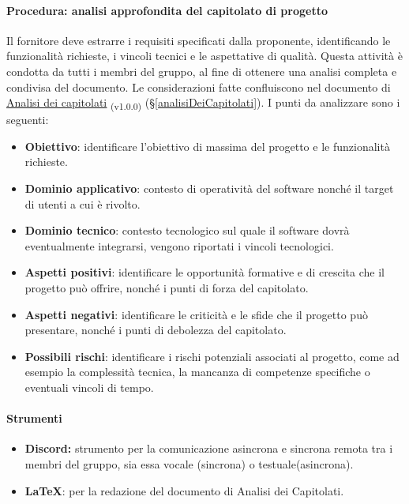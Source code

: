 \documentclass[a4paper,12pt]{article}
\newcommand{\ped}[1]{\textsubscript{#1}}
\begin{document}
\paragraph{Procedura: analisi approfondita del capitolato di progetto}
Il fornitore deve estrarre i requisiti specificati dalla proponente,
identificando le funzionalità richieste, i vincoli tecnici e le aspettative di
qualità. Questa attività è condotta da tutti i membri del gruppo, al fine di
ottenere una analisi completa e condivisa del documento. Le considerazioni
fatte confluiscono nel documento di
\href{https://7-zpus.github.io/Docs/assets/1_Candidatura/AnalisiCapitolati.pdf}{\ul{Analisi
        dei capitolati}} \ped{(v1.0.0)}
(§\ref{analisiDeiCapitolati}). I punti da analizzare sono i seguenti:
\begin{itemize}
    \item \textbf{Obiettivo}: identificare l'obiettivo di massima del progetto e le funzionalità richieste.
    \item \textbf{Dominio applicativo}: contesto di operatività del software nonché il target di utenti a cui è rivolto.
    \item \textbf{Dominio tecnico}: contesto tecnologico sul quale il software dovrà eventualmente integrarsi, vengono riportati i vincoli tecnologici.
    \item \textbf{Aspetti positivi}: identificare le opportunità formative e di crescita che il progetto può offrire, nonché i punti di forza del capitolato.
    \item \textbf{Aspetti negativi}: identificare le criticità e le sfide che il progetto può presentare, nonché i punti di debolezza del capitolato.
    \item \textbf{Possibili rischi}: identificare i rischi potenziali associati al progetto, come ad esempio la complessità tecnica, la mancanza di competenze specifiche o eventuali vincoli di tempo.
\end{itemize}
\paragraph{Strumenti}
\begin{itemize}
    \item \textbf{Discord:} strumento per la comunicazione asincrona e sincrona remota tra i membri del gruppo, sia essa vocale (sincrona) o testuale(asincrona).
    \item \textbf{\LaTeX}: per la redazione del documento di Analisi dei Capitolati.
\end{itemize}
\end{document}
